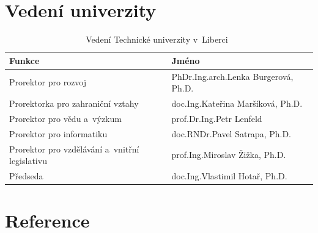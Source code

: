 \documentclass[a4paper,12pt,fonts]{./tulpackage/tularticle}
\newcommand{\custombibliography}{
  \vspace{2mm}
  \section*{Reference}
  \vspace{4mm}
  \printbibliography[heading=none]
}
\begin{document}
\section{Vedení univerzity}

\vspace{-0.6em}
\begin{table}[H]
\centering
\small
\begin{tabular}{ll}
\toprule
\textbf{Funkce} & \textbf{Jméno} \\
\midrule
Prorektor pro rozvoj & PhDr.\thinspace{}Ing.\thinspace{}arch.\thinspace{}Lenka Burgerová, Ph.D. \\
Prorektorka pro zahraniční vztahy & doc.\thinspace{}Ing.\thinspace{}Kateřina Maršíková, Ph.D. \\
Prorektor pro vědu a~výzkum & prof.\thinspace{}Dr.\thinspace{}Ing.\thinspace{}Petr Lenfeld \\
Prorektor pro informatiku & doc.\thinspace{}RNDr.\thinspace{}Pavel Satrapa, Ph.D. \\
Prorektor pro vzdělávání a~vnitřní legislativu & prof.\thinspace{}Ing.\thinspace{}Miroslav Žižka, Ph.D. \\
Předseda & doc.\thinspace{}Ing.\thinspace{}Vlastimil Hotař, Ph.D. \\
\bottomrule
\end{tabular}
\caption{Vedení Technické univerzity v~Liberci~\cite{vyrocnizprava}}
\label{tab:vedeni}
\end{table}

\clearpage

\custombibliography
\end{document}
